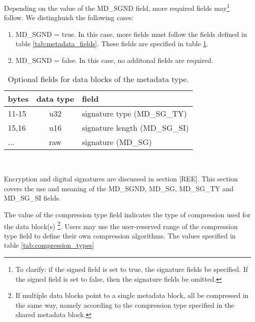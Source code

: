 \documentclass[pagesize=a4]{tufte-book}
\begin{document}
Depending on the value of the MD\_SGND field, more required fields may\footnote{To clarify: if the signed field is set to true, the signature fields  be specified. If the signed field is set to false, then the signature fields  be omitted.} follow. We distinghuish the following cases:

\begin{enumerate}
	\item MD\_SGND = true. In this case, more fields must follow the fields defined in table \ref{tab:metadata_fields}. These fields are specified in table \ref{tab:metadata_optional_fields}.
	\item MD\_SGND = false. In this case, no additonal fields are required.
\end{enumerate}

\begin{table}[ht]
	\centering
	\selectfont
	\begin{tabular}{lcl}
		\toprule
		bytes & data type & field\\
		\midrule
		11-15 & u32 & signature type (MD\_SG\_TY)\\
		15,16 & u16 & signature length (MD\_SG\_SI)\\
		... & raw & signature (MD\_SG)\\
		\bottomrule
	\end{tabular}
	~\label{tab:metadata_optional_fields}
	\caption{Optional fields for data blocks of the metadata type.}	
\end{table}
\vspace{5mm}

Encryption and digital signatures are discussed in section [REE]. This section covers the use and meaning of the MD\_SGND, MD\_SG, MD\_SG\_TY and MD\_SG\_SI fields.

The value of the compression type field indicates the type of compression used for the data block(s) \footnote{If multiple data blocks point to a single metadata block, all  be compressed in the same way, namely according to the compression type specified in the shared metadata block.}. Users may use the user-reserved range of the compression type field to define their own compression algorithms. The values specified in table \ref{tab:compression_types}
\end{document}
